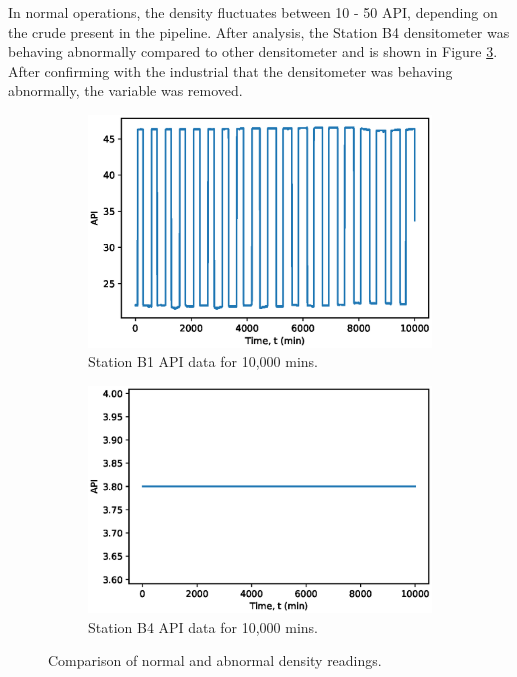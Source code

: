In normal operations, the density fluctuates between 10 - 50 API, depending on the crude present in the pipeline.  After analysis, the Station B4 densitometer was behaving abnormally compared to other densitometer and is shown in Figure \ref{fig:08Density}.  After confirming with the industrial that the densitometer was behaving abnormally, the variable was removed.  
\begin{figure}[h]
     \centering
     \begin{subfigure}[b]{0.48\textwidth}
         \centering
         \includegraphics[width=\textwidth]{images/suncor/08CheyDensity.eps}
         \caption{Station B1 API data for 10,000 mins.}
         \label{fig:08GoodDensity}
     \end{subfigure}
     \hfill
     \begin{subfigure}[b]{0.48\textwidth}
         \centering
         \includegraphics[width=\textwidth]{images/suncor/08FLDensity.eps}
         \caption{Station B4 API data for 10,000 mins.}
         \label{fig:08BadDensity}
     \end{subfigure}
        \caption{Comparison of normal and abnormal density readings.}
        \label{fig:08Density}
\end{figure}

